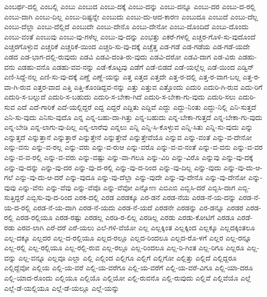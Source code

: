 {ಎಂಬರ್ಥ-ದಲ್ಲಿ
ಎಂಬಲ್ಲಿ
ಎಂಬು
ಎಂಬುದ
ಎಂಬು-ದಕ್ಕೆ
ಎಂಬು-ದನ್ನು
ಎಂಬು-ದನ್ನೂ
ಎಂಬು-ದರ
ಎಂಬು-ದ-ರಲ್ಲಿ
ಎಂಬು-ದಾಗಿ
ಎಂಬು-ದಿಲ್ಲ
ಎಂಬು-ದಿಷ್ಟನ್ನೇ
ಎಂಬುದು
ಎಂಬು-ದು-ಆದ-ಕಾರಣ
ಎಂಬುದೂ
ಎಂಬುದೆ
ಎಂಬು-ದೆಲ್ಲ
ಎಂಬು-ದೆಲ್ಲಾ
ಎಂಬು-ದೆಲ್ಲಿದೆ
ಎಂಬುದೇ
ಎಂಬು-ದೇನೊ
ಎಂಬು-ದೇನೋ
ಎಂಬು-ದೊಂದಿದೆ
ಎಂಬು-ದೊಂದು
ಎಂಬು-ವಂತೆ
ಎಂಬುವು
ಎಂಬು-ವು-ಗಳೆಲ್ಲ
ಎಂಬು-ವು-ದನ್ನು
ಎಂಭತ್ತು
ಎಕರೆ-ಗಳಲ್ಲಿ
ಎಚ್ಚರ-ಗೊಳಿ-ಸು-ವುದೊಂದೆ
ಎಚ್ಚರಗೊಳ್ಳುವ
ಎಚ್ಚರಿಕೆ
ಎಚ್ಚರಿಕೆ-ಯಿಂದ
ಎಚ್ಚರಿ-ಸು-ವು-ದಕ್ಕೆ
ಎಚ್ಚೆತ್ತ
ಎಡ-ಗಡೆ
ಎಡ-ಗಡೆಯ
ಎಡ-ಗಡೆ-ಯದೇ
ಎಡದ
ಎಡ-ಭಾಗ-ದಲ್ಲಿ-ರುವುದು
ಎಡವಿ
ಎಡವಿ-ದಂತಿ-ರು-ವುದು
ಎಡವಿ-ದರೋ
ಎಡವಿ-ದಾಗ
ಎಡ-ವಿರು
ಎಡಹು-ವನು
ಎಡಹು-ವನೊ
ಎಡಹು-ವವ-ನನ್ನು
ಎಡೆ-ಕೊಟ್ಟವು
ಎಡೆಗೆ
ಎಡೆ-ಬಿಡದೆ
ಎಡೆ-ಯಲ್ಲೆಲ್ಲ
ಎಡೆ-ಯಿಂದ
ಎಡ್ವಿನ್
ಎಣಿ-ಸಿದ್ದೆ-ನಲ್ಲ
ಎಣಿ-ಸು-ವು-ದಕ್ಕೆ
ಎಣ್ಣೆ
ಎಣ್ಣೆ-ಯನ್ನು
ಎತ್ತ
ಎತ್ತದ
ಎತ್ತದೇ
ಎತ್ತ-ರ-ದಲ್ಲಿ
ಎತ್ತ-ರ-ವಾಗ-ಬಲ್ಲ
ಎತ್ತ-ರ-ವಾ-ಗಿ-ರುವ
ಎತ್ತರ-ವಾದ
ಎತ್ತಿ
ಎತ್ತಿ-ಕೊಂಡಿದ್ದವ-ನನ್ನು
ಎತ್ತು
ಎತ್ತುವ
ಎತ್ತೊಂದು
ಎದುರಿ
ಎದುರಿ-ಗಿ-ರುವ
ಎದು-ರಿಗೆ
ಎದುರಿ-ಸ-ಬಲ್ಲುದೆ
ಎದುರಿ-ಸ-ಬಹುದು
ಎದುರಿ-ಸ-ಬೇಕಾ-ಗಿದೆ
ಎದುರಿ-ಸ-ಬೇಕಾ-ಗು-ವುದು
ಎದುರಿ-ಸಲು
ಎದುರಿ-ಸುವ
ಎದೆ
ಎದೆ-ಗಾರಿಕೆ
ಎದೆ-ಯಲ್ಲಿದ್ದರೆ
ಎದ್ದ
ಎದ್ದರೆ
ಎದ್ದಿತು
ಎದ್ದಿವೆ
ಎದ್ದು
ಎದ್ದು-ನಿಂತು
ಎದ್ದು-ನಿಲ್ಲಿ
ಎನಿ-ಸುತ್ತದೆ
ಎನಿ-ಸು-ವುದು
ಎನಿಸು-ವುದೊ
ಎನ್ನ
ಎನ್ನ-ಬಹು-ದಾ-ಗಿತ್ತು
ಎನ್ನ-ಬಹುದು
ಎನ್ನ-ಬೇಕಾ-ಗುತ್ತದೆ
ಎನ್ನ-ಬೇಕಾ-ಗು-ವುದು
ಎನ್ನ-ಬೇಡಿ
ಎನ್ನ-ಲಾಗು-ವು-ದಿಲ್ಲ
ಎನ್ನ-ಲಾರೆವು
ಎನ್ನಲು
ಎನ್ನಿ
ಎನ್ನಿ-ಸಿ-ಕೊಳ್ಳುವ
ಎನ್ನಿ-ಸಿತು
ಎನ್ನಿ-ಸು-ವುದು
ಎನ್ನು
ಎನ್ನುತ್ತದೆ
ಎನ್ನುತ್ತಾನೆ
ಎನ್ನುತ್ತಾರೆ
ಎನ್ನುತ್ತೇನೆ
ಎನ್ನುತ್ತೇವೆ
ಎನ್ನುತ್ತೇವೆಯೊ
ಎನ್ನುವ
ಎನ್ನು-ವಂತೆ
ಎನ್ನು-ವ-ದೇನೋ
ಎನ್ನು-ವನು
ಎನ್ನು-ವ-ರಲ್ಲ
ಎನ್ನು-ವರು
ಎನ್ನು-ವ-ರುಆ
ಎನ್ನು-ವರೊ
ಎನ್ನು-ವ-ವ-ನಂತೆ
ಎನ್ನು-ವ-ವನು
ಎನ್ನು-ವ-ವರ
ಎನ್ನು-ವ-ವ-ರಲ್ಲಿ
ಎನ್ನು-ವ-ವರು
ಎನ್ನು-ವಷ್ಟು
ಎನ್ನು-ವಾ-ಗಲೂ
ಎನ್ನು-ವಿರಿ
ಎನ್ನು-ವಿರೊ
ಎನ್ನುವು
ಎನ್ನು-ವು-ದಕ್ಕೆ
ಎನ್ನು-ವು-ದನ್ನು
ಎನ್ನು-ವು-ದರ
ಎನ್ನು-ವು-ದ-ರಲ್ಲಿ
ಎನ್ನು-ವು-ದ-ರಿಂದ
ಎನ್ನು-ವು-ದಿಲ್ಲ
ಎನ್ನು-ವುದು
ಎನ್ನು-ವು-ದು-ಆ-ಗಲೆ
ಎನ್ನು-ವು-ದು-ಆ-ದರೆ
ಎನ್ನು-ವುದೂ
ಎನ್ನು-ವು-ದೆಲ್ಲಾ
ಎನ್ನು-ವುದೇ
ಎನ್ನು-ವು-ದೇನೊ
ಎನ್ನು-ವು-ದೇನೋ
ಎನ್ನು-ವುವು
ಎನ್ನು-ವೆನು
ಎನ್ನು-ವೆವು
ಎನ್ನು-ವೆವೊ
ಎನ್ನು-ವೆವೋ
ಎನ್ನೋಣ
ಎಬಿಎಬಿ
ಎಬ್ಬಿಸಿ-ದರೆ
ಎಬ್ಬಿಸಿ-ದಾಗ
ಎಬ್ಬಿ-ಸುತ್ತಿದ್ದರೆ
ಎಬ್ಬಿಸು-ವು-ದ-ರಿಂದ
ಎರಕ-ದಲ್ಲಿ
ಎರಡ
ಎರಡಕ್ಕೂ
ಎರ-ಡನೆ
ಎರಡ-ನೆಯ
ಎರಡ-ನೆ-ಯ-ದನ್ನು
ಎರಡ-ನೆ-ಯ-ದ-ರಲ್ಲಿ
ಎರಡ-ನೆ-ಯ-ದಾಗಿ
ಎರಡ-ನೆ-ಯದು
ಎರಡ-ನೆ-ಯದೆ
ಎರಡನೇ
ಎರಡನ್ನು
ಎರ-ಡನ್ನೂ
ಎರಡರ
ಎರಡ-ರಲ್ಲಿ
ಎರಡ-ರಲ್ಲಿಯೂ
ಎರಡ-ರಷ್ಟು
ಎರಡಲ್ಲ
ಎರಡಿ-ರ-ಲಿಲ್ಲ
ಎರಡಿಲ್ಲ
ಎರಡು
ಎರಡು-ಕೋಟಿಗೆ
ಎರಡೂ
ಎರಡೆ-ರಡು
ಎರವ-ಲಾಗಿ
ಎರೆ-ದರೆ
ಎರೆ-ಯಲು
ಎಲೆ-ಗಳಿ-ವೆಯೋ
ಎಲ್ಲ
ಎಲ್ಲಕ್ಕಿಂತ
ಎಲ್ಲಕ್ಕಿಂದ
ಎಲ್ಲಕ್ಕೂ
ಎಲ್ಲದಕ್ಕಿಂತಲೂ
ಎಲ್ಲ-ದಕ್ಕೂ
ಎಲ್ಲದರ
ಎಲ್ಲ-ದ-ರಲ್ಲಿಯೂ
ಎಲ್ಲದ-ರಲ್ಲೂ
ಎಲ್ಲದ-ರಿಂದಲೂ
ಎಲ್ಲದ-ರೊ-ಳಗೆ
ಎಲ್ಲರ
ಎಲ್ಲ-ರನ್ನೂ
ಎಲ್ಲ-ರಲ್ಲಿ
ಎಲ್ಲ-ರಲ್ಲಿಯೂ
ಎಲ್ಲ-ರಲ್ಲಿ-ರುವ
ಎಲ್ಲ-ರಲ್ಲೂ
ಎಲ್ಲ-ರಿಂದಲೂ
ಎಲ್ಲ-ರಿ-ಗಿಂತ
ಎಲ್ಲ-ರಿಗೂ
ಎಲ್ಲರೂ
ಎಲ್ಲ-ವನ್ನು
ಎಲ್ಲ-ವನ್ನೂ
ಎಲ್ಲವೂ
ಎಲ್ಲಾ
ಎಲ್ಲಿ
ಎಲ್ಲಿಂದ
ಎಲ್ಲಿಗೂ
ಎಲ್ಲಿಗೆ
ಎಲ್ಲಿಗೋ
ಎಲ್ಲಿತ್ತು
ಎಲ್ಲಿದೆ
ಎಲ್ಲಿದ್ದರೂ
ಎಲ್ಲಿದ್ದೆವೋ
ಎಲ್ಲಿಯ
ಎಲ್ಲಿ-ಯ-ವರೆ
ಎಲ್ಲಿ-ಯ-ವರೆಗೂ
ಎಲ್ಲಿ-ಯ-ವರೆಗೆ
ಎಲ್ಲಿ-ಯ-ವರೆ-ವಿಗೂ
ಎಲ್ಲಿ-ಯಾ-ದರೂ
ಎಲ್ಲಿ-ಯಾದ-ರೊಂದು
ಎಲ್ಲಿಯೂ
ಎಲ್ಲಿಯೊ
ಎಲ್ಲಿಯೋ
ಎಲ್ಲಿ-ರುವನೊ
ಎಲ್ಲಿ-ರುವುದು
ಎಲ್ಲಿವೆ
ಎಲ್ಲಿವೆಯೊ
ಎಲ್ಲೆ
ಎಲ್ಲೆ-ಡೆ-ಯಲ್ಲಿಯೂ
ಎಲ್ಲೆ-ಡೆ-ಯಲ್ಲೂ
ಎಲ್ಲೆ-ಯನ್ನು
}
